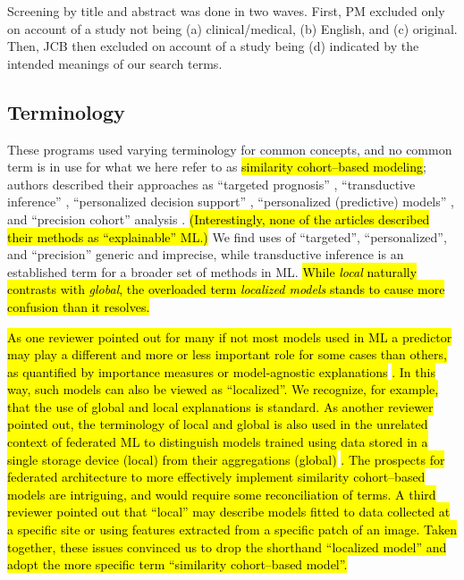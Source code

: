 \documentclass[sn-mathphys,Numbered,pdflatex]{sn-jnl}
\theoremstyle{remark}
\theoremstyle{definition}
\begin{document}
Screening by title and abstract was done in two waves. First, PM
excluded only on account of a study not being (a) clinical/medical, (b)
English, and (c) original. Then, JCB then excluded on account of a study
being (d) indicated by the intended meanings of our search terms.

\subsection*{Terminology}\label{terminology}

These programs used varying terminology for common concepts, and no
common term is in use for what we here refer to as
\hl{similarity cohort--based modeling}; authors described their
approaches as ``targeted prognosis'' \citep{Mariuzzi1997},
``transductive inference'' \citep{Song2006}, ``personalized decision
support'' \citep{Lee2015}, ``personalized (predictive) models''
\citetext{\citealp[in contrast to ``local
models'']{Liang2015}; \citealp{Ng2015}; \citealp{Wang2019}; \citealp{Ma2020}; \citealp{Liu2022}; \citealp{Doborjeh2022}},
and ``precision cohort'' analysis \citep{Wang2019, Tang2021, Ng2021}.
\hl{(Interestingly, none of the articles described their methods as ``explainable'' ML.)}
We find uses of ``targeted'', ``personalized'', and ``precision''
generic and imprecise, while transductive inference is an established
term for a broader set of methods in ML.
\hl{While \emph{local} naturally contrasts with \emph{global}, the overloaded term \emph{localized models} stands to cause more confusion than it resolves.}

\hl{As one reviewer pointed out for many if not most models used in ML a predictor may play a different and more or less important role for some cases than others, as quantified by importance measures or model-agnostic explanations }\citep{Biecek2021, Molnar2023}\hl{. In this way, such models can also be viewed as ``localized''. We recognize, for example, that the use of global and local explanations is standard. As another reviewer pointed out, the terminology of local and global is also used in the unrelated context of federated ML to distinguish models trained using data stored in a single storage device (local) from their aggregations (global) }\citep{Moshawrab2023, Brauneck2023}\hl{. The prospects for federated architecture to more effectively implement similarity cohort--based models are intriguing, and would require some reconciliation of terms.
A third reviewer pointed out that ``local'' may describe models fitted to data collected at a specific site or using features extracted from a specific patch of an image. Taken together, these issues convinced us to drop the shorthand ``localized model'' and adopt the more specific term ``similarity cohort--based model''.}
\end{document}
